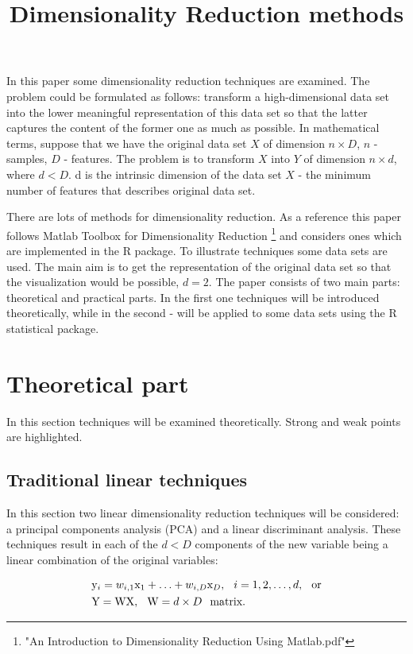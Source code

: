 \documentclass[a4paper]{article}
\begin{document}
\title{Dimensionality Reduction methods}
\maketitle

In this paper some dimensionality reduction techniques are
examined. The problem could be formulated as follows: transform a
high-dimensional data set into the lower meaningful representation of
this data set so that the latter captures the content of the
former one as much as possible. In mathematical terms, suppose that
we have the original data set $X$ of dimension $n \times D$, $n$ -
samples, $D$ - features. The problem is to transform $X$ into $Y$ of
dimension $n \times d$, where $d < D$. d is the intrinsic dimension of
the data set $X$ - the minimum number of features that describes
original data set.

There are lots of methods for dimensionality reduction. As a reference
this paper follows Matlab Toolbox for Dimensionality Reduction \footnote{"An
  Introduction to Dimensionality Reduction Using Matlab.pdf"} and
considers ones which are implemented in the R package. To illustrate techniques some data sets are used. The main aim is to get the
representation of the original data set so that the visualization
would be possible, $d = 2$. The paper consists of two main parts:
theoretical and practical parts. In the first one techniques will be
introduced theoretically, while in the second - will be applied to
some data sets using the R statistical package.

\section{Theoretical part}
In this section techniques will be examined theoretically. Strong and
weak points are highlighted.

\subsection{Traditional linear techniques}
In this section two linear dimensionality reduction techniques will be
considered: a principal components analysis (PCA) and a linear discriminant
analysis. These techniques result in each of the $d < D$ components of the new variable being a linear combination of the original variables:

\begin{align}
  &\mathrm{y}_i = w_{i,1}\mathrm{x}_1 + \ldots + w_{i,D}\mathrm{x}_D,\hspace{0.25cm} i =
  1,2,\ldots, d, \hspace{0.25cm} \text{or}\\
  &\mathrm{Y} = \mathrm{W}\mathrm{X} \label{eq:trans}, \hspace{0.25cm} \mathrm{W} = d \times D \hspace{0.25cm} \text{matrix}.
\end{align}
\end{document}

